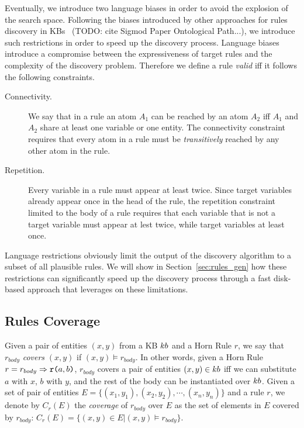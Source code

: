 Eventually, we introduce two language biases in order to avoid the explosion of the search space. 
Following the biases introduced by other approaches for rules discovery in KBs~\cite{galarraga2015fast} (TODO: cite Sigmod Paper Ontological Path...), we introduce such restrictions in order to speed up the discovery process. Language biases introduce a compromise between the expressiveness of target rules and the complexity of the discovery problem. Therefore we define a rule \emph{valid} iff it follows the following constraints.
\begin{description}
	\item[Connectivity.] We say that in a rule an atom $A_1$ can be reached by an atom $A_2$ iff $A_1$ and $A_2$ share at least one variable or one entity. The connectivity constraint requires that every atom in a rule must be \emph{transitively} reached by any other atom in the rule.
	\item[Repetition.] Every variable in a rule must appear at least twice. Since target variables already appear once in the head of the rule, the repetition constraint limited to the body of a rule requires that each variable that is not a target variable must appear at lest twice, while target variables at least once.
\end{description}
Language restrictions obviously limit the output of the discovery algorithm to a subset of all plausible rules. We will show in Section~\ref{sec:rules_gen} how these restrictions can significantly speed up the discovery process through a fast disk-based approach that leverages on these limitations.

\subsection{Rules Coverage}
Given a pair of entities $(x,y)$ from a KB ${\sc kb}$ and a Horn Rule $r$, we say that $r_{body}$ \emph{covers} $(x,y)$ if
$(x,y) \models r_{body}$. In other words, given a Horn Rule $r = r_{body} \Rightarrow \texttt{r(}a,b\texttt{)}$, $r_{body}$ covers a pair of entities $(x,y) \in {\sc kb}$ iff we can substitute $a$ with $x$, $b$ with $y$, and the rest of the body can be instantiated over ${\sc kb}$. Given a set of pair of entities $E = \{(x_1,y_1),(x_2,y_2),\cdots,(x_n,y_n)\}$ and a rule $r$, we denote by $C_r(E)$ the \emph{coverage} of $r_{body}$ over $E$ as the set of elements in $E$ covered by $r_{body}$: $C_r(E)=\{(x,y) \in E | (x,y) \models r_{body}\}$.

